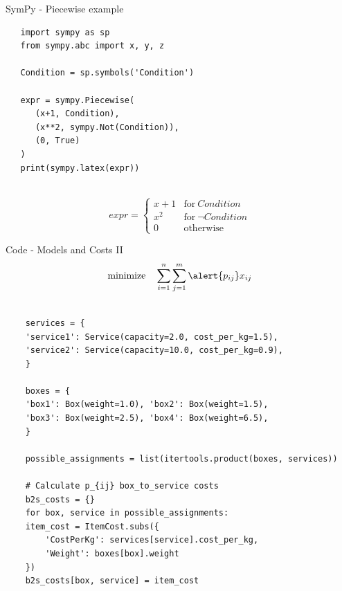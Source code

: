 \documentclass[10pt,utf8,presentation]{beamer}
\begin{document}
\begin{frame}[fragile]{SymPy - Piecewise example}

  \begin{verbatim}
   import sympy as sp
   from sympy.abc import x, y, z
   
   Condition = sp.symbols('Condition')
   
   expr = sympy.Piecewise(
      (x+1, Condition), 
      (x**2, sympy.Not(Condition)), 
      (0, True)
   )
   print(sympy.latex(expr))
   
  \end{verbatim}
\begin{center}
  \[
  expr = 
  \begin{cases}
    x + 1 & \text{for}\: Condition \\
    x^{2} & \text{for}\: \neg Condition \\
    0 & \text{otherwise}                                                                                    
  \end{cases}
  \]
\end{center}

\end{frame}


\begin{frame}[fragile]{Code - Models and Costs II}
  \[\text{minimize} \quad \sum_{i=1}^{n} \sum_{j=1}^{m} \alert{p_{ij}} x_{ij}\]

  \scriptsize
  \begin{verbatim}
      
    services = {
	'service1': Service(capacity=2.0, cost_per_kg=1.5),
	'service2': Service(capacity=10.0, cost_per_kg=0.9),
    }

    boxes = {
	'box1': Box(weight=1.0), 'box2': Box(weight=1.5),
	'box3': Box(weight=2.5), 'box4': Box(weight=6.5),
    }
	
    possible_assignments = list(itertools.product(boxes, services))
    
    # Calculate p_{ij} box_to_service costs
    b2s_costs = {}
    for box, service in possible_assignments:
	item_cost = ItemCost.subs({
	    'CostPerKg': services[service].cost_per_kg,
	    'Weight': boxes[box].weight
	})
	b2s_costs[box, service] = item_cost
  
  \end{verbatim}

\end{frame}
\end{document}
